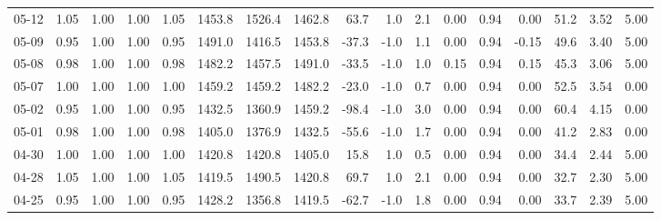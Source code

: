 \begin{threeparttable}
{\begin{tabular}{lrrrrrrrrrrrrrrrr}
  05-12 &         1.05 &           1.00 &          1.00 &          1.05 & 1453.8 & 1526.4 & 1462.8 &       63.7 &                      1.0 &                 2.1 &       0.00 &      0.94 &           0.00 &             51.2 &            3.52 &                   5.00 \\
  05-09 &         0.95 &           1.00 &          1.00 &          0.95 & 1491.0 & 1416.5 & 1453.8 &      -37.3 &                     -1.0 &                 1.1 &       0.00 &      0.94 &          -0.15 &             49.6 &            3.40 &                   5.00 \\
  05-08 &         0.98 &           1.00 &          1.00 &          0.98 & 1482.2 & 1457.5 & 1491.0 &      -33.5 &                     -1.0 &                 1.0 &       0.15 &      0.94 &           0.15 &             45.3 &            3.06 &                   5.00 \\
  05-07 &         1.00 &           1.00 &          1.00 &          1.00 & 1459.2 & 1459.2 & 1482.2 &      -23.0 &                     -1.0 &                 0.7 &       0.00 &      0.94 &           0.00 &             52.5 &            3.54 &                   0.00 \\
  05-02 &         0.95 &           1.00 &          1.00 &          0.95 & 1432.5 & 1360.9 & 1459.2 &      -98.4 &                     -1.0 &                 3.0 &       0.00 &      0.94 &           0.00 &             60.4 &            4.15 &                   0.00 \\
  05-01 &         0.98 &           1.00 &          1.00 &          0.98 & 1405.0 & 1376.9 & 1432.5 &      -55.6 &                     -1.0 &                 1.7 &       0.00 &      0.94 &           0.00 &             41.2 &            2.83 &                   0.00 \\
  04-30 &         1.00 &           1.00 &          1.00 &          1.00 & 1420.8 & 1420.8 & 1405.0 &       15.8 &                      1.0 &                 0.5 &       0.00 &      0.94 &           0.00 &             34.4 &            2.44 &                   5.00 \\
  04-28 &         1.05 &           1.00 &          1.00 &          1.05 & 1419.5 & 1490.5 & 1420.8 &       69.7 &                      1.0 &                 2.1 &       0.00 &      0.94 &           0.00 &             32.7 &            2.30 &                   5.00 \\
  04-25 &         0.95 &           1.00 &          1.00 &          0.95 & 1428.2 & 1356.8 & 1419.5 &      -62.7 &                     -1.0 &                 1.8 &       0.00 &      0.94 &           0.00 &             33.7 &            2.39 &                   5.00 \\

\end{tabular}}
\end{threeparttable}
